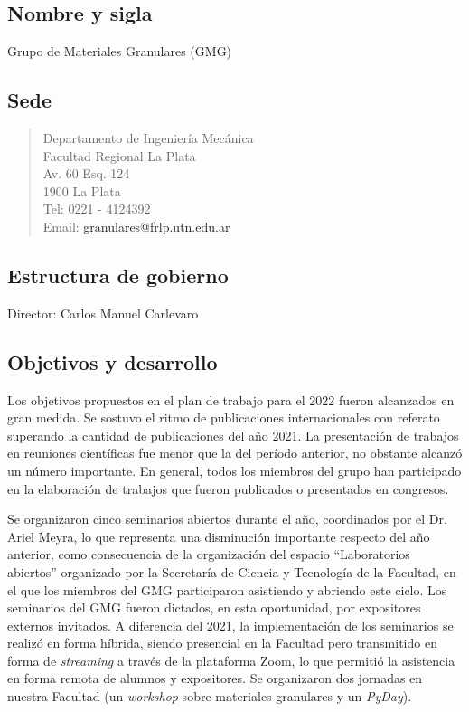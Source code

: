 \documentclass[a4paper,11pt,twoside,final,titlepage,onecolumn,openright]{report}
\begin{document}
\subsection{Nombre y sigla}
 Grupo de Materiales Granulares (GMG)

 \subsection{Sede}
\begin{quote}
Departamento de Ingeniería Mecánica \\
Facultad Regional La Plata\\
Av. 60 Esq. 124\\
1900 La Plata \\
Tel: 0221 - 4124392\\
Email: \href{mailto://granulares@frlp.utn.edu.ar}{granulares@frlp.utn.edu.ar}
\end{quote}


\subsection{Estructura de gobierno}
Director: Carlos Manuel Carlevaro

\subsection{Objetivos y desarrollo}
Los objetivos propuestos en el plan de trabajo para el 2022 fueron alcanzados en gran medida. Se sostuvo el ritmo de publicaciones internacionales con referato superando la cantidad de publicaciones del año 2021. La presentación de trabajos en reuniones científicas fue menor que la del período anterior, no obstante alcanzó un número importante. En general, todos los miembros del grupo han participado en la elaboración de trabajos que fueron publicados o presentados en congresos.

Se organizaron cinco seminarios abiertos durante el año, coordinados por el Dr. Ariel Meyra, lo que representa una disminución importante respecto del año anterior, como consecuencia de la organización del espacio ``Laboratorios abiertos'' organizado por la Secretaría de Ciencia y Tecnología de la Facultad, en el que los miembros del GMG participaron asistiendo y abriendo este ciclo. Los seminarios del GMG fueron dictados, en esta oportunidad, por expositores externos invitados. A diferencia del 2021, la implementación de los seminarios se realizó en forma híbrida, siendo presencial en la Facultad pero transmitido en forma de \textit{streaming} a través de la plataforma Zoom, lo que permitió la asistencia en forma remota de alumnos y expositores. Se organizaron dos jornadas en nuestra Facultad (un \textit{workshop} sobre materiales granulares y un \textit{PyDay}). 
\end{document}

